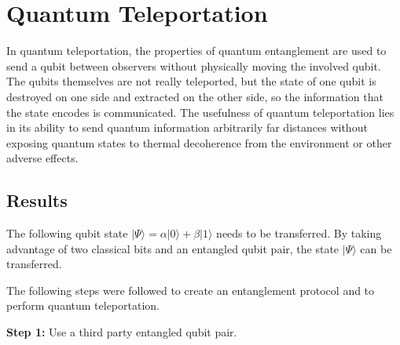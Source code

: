 \renewcommand{\chaptername}{March 15th: Lab}
\chapter{Quantum Teleportation}

In quantum teleportation, the properties of quantum entanglement are used to send a qubit between observers without physically moving the involved qubit. The qubits themselves are not really teleported, but the state of one qubit is destroyed on one side and extracted on the other side, so the information that the state encodes is communicated. The usefulness of quantum teleportation lies in its ability to send quantum information arbitrarily far distances without exposing quantum states to thermal decoherence from the environment or other adverse effects.

\section{Results} \label{sec:teleResults}
The following qubit state  $|\Psi \rangle = \alpha |0 \rangle + \beta |1 \rangle$ needs to be transferred. By taking advantage of two classical bits and an entangled qubit pair, the state $|\Psi \rangle$ can be transferred.

The following steps were followed to create an entanglement protocol and to perform quantum teleportation.

\textbf{Step 1:} Use a third party entangled qubit pair.

